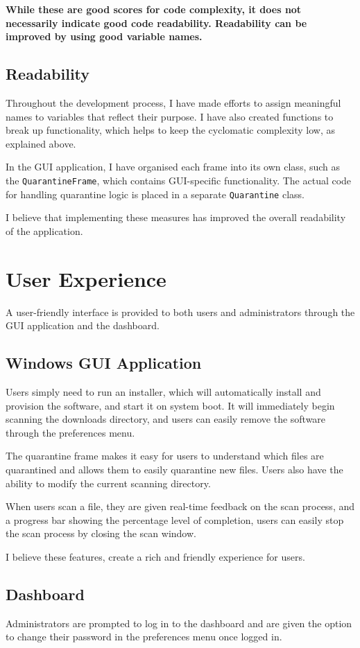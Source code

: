 \textbf{While these are good scores for code complexity,
it does not necessarily indicate good code readability.
Readability can be improved by using good variable names.}

\subsection{Readability}
Throughout the development process,
I have made efforts to assign meaningful names
to variables that reflect their purpose.
I have also created functions to break up functionality,
which helps to keep the cyclomatic complexity low, as explained above.

In the GUI application, I have organised each frame into its own class,
such as the \texttt{QuarantineFrame},
which contains GUI-specific functionality.
The actual code for handling quarantine logic
is placed in a separate \texttt{Quarantine} class.

I believe that implementing these measures has improved
the overall readability of the application.

\section{User Experience}
A user-friendly interface is provided to both users and
administrators through the GUI application and the dashboard.

\subsection{Windows GUI Application}
Users simply need to run an installer,
which will automatically install and provision the software,
and start it on system boot.
It will immediately begin scanning the downloads directory,
and users can easily remove the software through the preferences menu.

The quarantine frame makes it easy for users to understand which
files are quarantined and allows them to easily quarantine new files.
Users also have the ability to modify the current scanning directory.

When users scan a file, they are given real-time feedback on the scan process,
and a progress bar showing the percentage level of completion,
users can easily stop the scan process by closing the scan window.

I believe these features, create a rich and friendly experience for users.

\subsection{Dashboard}
Administrators are prompted to log in to the dashboard and are
given the option to change their password in the
preferences menu once logged in.

